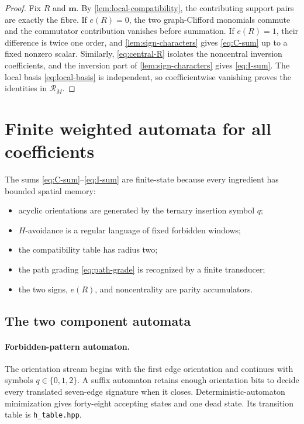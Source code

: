 \documentclass[10pt,letterpaper]{article}
\newcommand{\code}[1]{\nolinkurl{#1}}
\begin{document}
\begin{proof}
Fix \(R\) and \(\bm m\).  By \cref{lem:local-compatibility}, the contributing support pairs are exactly the fibre.  If \(e(R)=0\), the two graph-Clifford monomials commute and the commutator contribution vanishes before summation.  If \(e(R)=1\), their difference is twice one order, and \cref{lem:sign-characters} gives \eqref{eq:C-sum} up to a fixed nonzero scalar.  Similarly, \eqref{eq:central-R} isolates the noncentral inversion coefficients, and the inversion part of \cref{lem:sign-characters} gives \eqref{eq:I-sum}.  The local basis \eqref{eq:local-basis} is independent, so coefficientwise vanishing proves the identities in \(\mathscr R_M\).
\end{proof}

\section{Finite weighted automata for all coefficients}\label{sec:automata}

The sums \eqref{eq:C-sum}--\eqref{eq:I-sum} are finite-state because every ingredient has bounded spatial memory:
\begin{itemize}
\item acyclic orientations are generated by the ternary insertion symbol \(q\);
\item \(H\)-avoidance is a regular language of fixed forbidden windows;
\item the compatibility table has radius two;
\item the path grading \eqref{eq:path-grade} is recognized by a finite transducer;
\item the two signs, \(e(R)\), and noncentrality are parity accumulators.
\end{itemize}

\subsection{The two component automata}

\paragraph{Forbidden-pattern automaton.}
The orientation stream begins with the first edge orientation and continues with symbols \(q\in\{0,1,2\}\).  A suffix automaton retains enough orientation bits to decide every translated seven-edge signature when it closes.  Deterministic-automaton minimization gives forty-eight accepting states and one dead state.  Its transition table is \code{h_table.hpp}.
\end{document}

